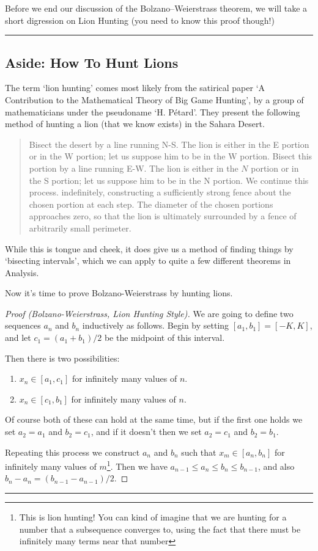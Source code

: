 \documentclass[11pt, a4paper]{article}
\theoremstyle{definition}
\newenvironment{aside}[1]{
	\noindent
    \rule{\textwidth}{0.025cm}
    \vspace{-1.75\baselineskip}
    \subsection*{#1}}
{\noindent\rule{\textwidth}{0.025cm}}
\begin{document}
Before we end our discussion of the Bolzano–Weierstrass theorem, we will take a short digression on Lion Hunting (you need to know this proof though!)


\begin{aside}{Aside: How To Hunt Lions}

	The term `lion hunting' comes most likely from the satirical paper `A Contribution to the Mathematical Theory of Big Game Hunting', by a group of mathematicians under the pseudoname `H. Pétard'. They present the following method of hunting a lion (that we know exists) in the Sahara Desert.

	\begin{quote}
		Bisect the desert by a line running N-S. The lion is either in the E portion or in the W portion; let us suppose him to be in the W portion. Bisect this portion by a line running E-W. The lion is either in the $N$ portion or in the S portion; let us suppose him to be in the N portion. We continue this process. indefinitely, constructing a sufficiently strong fence about the chosen portion at each step. The diameter of the chosen portions approaches zero, so that the lion is ultimately surrounded by a fence of arbitrarily small perimeter.
	\end{quote}
	While this is tongue and cheek, it does give us a method of finding things by `bisecting intervals', which we can apply to quite a few different theorems in Analysis. 

	Now it's time to prove Bolzano-Weierstrass by hunting lions.


\begin{proof}[Proof (Bolzano-Weierstrass, Lion Hunting Style)]
	We are going to define two sequences $a_n$ and $b_n$ inductively as follows. Begin by setting $[a_1, b_1] = [-K, K]$, and let $c_1 = (a_1 + b_1)/2$ be the midpoint of this interval.

	Then there is two possibilities:
	\begin{enumerate}
		\item $x_n \in [a_1, c_1]$ for infinitely many values of $n$.
		\item $x_n \in [c_1, b_1]$ for infinitely many values of $n$.
	\end{enumerate}
	Of course both of these can hold at the same time, but if the first one holds we set $a_2 = a_1$ and $b_2 = c_1$, and if it doesn't then we set $a_2 = c_1$ and $b_2 = b_1$.

	Repeating this process we construct $a_n$ and $b_n$ such that $x_m \in [a_n, b_n]$ for infinitely many values of $m$\footnote{This is lion hunting! You can kind of imagine that we are hunting for a number that a subsequence converges to, using the fact that there must be infinitely many terms near that number}.
	Then we have $a_{n - 1} \leq a_n \leq b_n \leq b_{n - 1}$, and also $b_n - a_n = (b_{n - 1} - a_{n - 1})/2$. 


\end{proof}
\end{aside}
\end{document}
